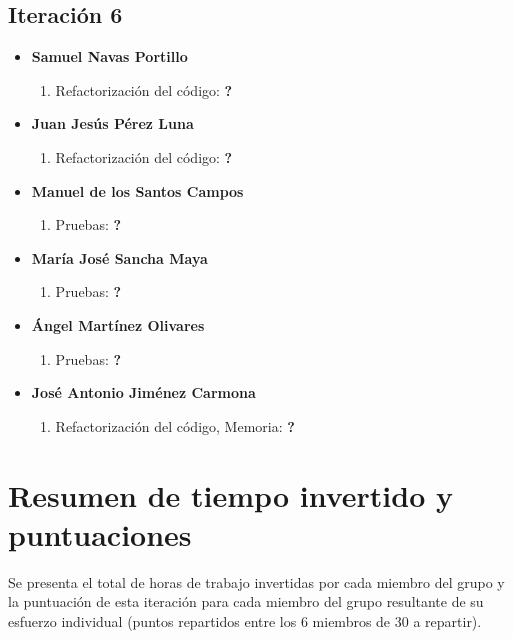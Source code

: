 \documentclass[11 pt]{book}
\begin{document}
	\subsection*{Iteración 6}
		    \begin{itemize}
			    \item \textbf {Samuel Navas Portillo}
				    \begin{enumerate}
					    \item Refactorización del código: \textbf{?}
				    \end{enumerate}
			    \item \textbf {Juan Jesús Pérez Luna}
				    \begin{enumerate}
					    \item Refactorización del código: \textbf{?}
				    \end{enumerate}
			    \item \textbf {Manuel de los Santos Campos}
				    \begin{enumerate}
					    \item Pruebas: \textbf{?}
				    \end{enumerate}
			    \item \textbf {María José Sancha Maya}
				    \begin{enumerate}
					    \item Pruebas: \textbf{?}
				    \end{enumerate}
			    \item \textbf {Ángel Martínez Olivares}
				    \begin{enumerate}
					    \item Pruebas: \textbf{?}
				    \end{enumerate}
			    \item \textbf {José Antonio Jiménez Carmona}
				    \begin{enumerate}
					    \item Refactorización del código, Memoria: \textbf{?}
				    \end{enumerate}
		    \end{itemize}
	\section{Resumen de tiempo invertido y puntuaciones}
		Se presenta el total de horas de trabajo invertidas por cada miembro del grupo y la puntuación de esta iteración para cada miembro del grupo resultante de su esfuerzo individual (puntos repartidos entre los 6 miembros de 30 a repartir).\\
			
\end{document}
